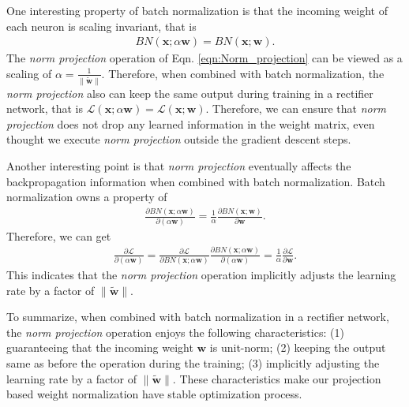 \documentclass[twocolumn]{article}
\begin{document}
One interesting property of batch normalization is that the incoming weight of each neuron is scaling invariant, that is
\begin{eqnarray}
BN(\mathbf{x}; \alpha \mathbf{w})=BN(\mathbf{x}; \mathbf{w}).
\end{eqnarray}
The \emph{norm projection} operation of Eqn. \ref{eqn:Norm_projection} can be viewed as a scaling of $\alpha=\frac{1}{\| \tilde{\mathbf{w}} \|}$. Therefore, when combined with batch normalization, the \emph{norm projection} also can keep the same output during training in a rectifier network, that is $\mathcal{L}(\mathbf{x}; \alpha \mathbf{w})=\mathcal{L}(\mathbf{x}; \mathbf{w})$. Therefore, we can ensure that \emph{norm projection} does not drop any learned information in the weight matrix, even thought we execute \emph{norm projection} outside the gradient descent steps.

Another interesting point is that \emph{norm projection} eventually affects the backpropagation information when combined with batch normalization. Batch normalization owns a property of
\begin{eqnarray}
\frac{\partial BN(\mathbf{x}; \alpha \mathbf{w}) }{\partial (\alpha \mathbf{w})}=\frac{1}{\alpha}   \frac{\partial BN(\mathbf{x}; \mathbf{w}) }{\partial  \mathbf{w}}.
\end{eqnarray}
Therefore, we can get
\begin{eqnarray}
\frac{\partial \mathcal{L} }{\partial (\alpha \mathbf{w})}
=\frac{\partial \mathcal{L} }{\partial BN(\mathbf{x}; \alpha \mathbf{w}) }   \frac{\partial BN(\mathbf{x}; \alpha \mathbf{w})  }{\partial (\alpha \mathbf{w})}
=\frac{1}{\alpha } \frac{\partial \mathcal{L} }{\partial  \mathbf{w}}.
\end{eqnarray}
This indicates that the \emph{norm projection} operation implicitly adjusts the learning rate by a factor of $\| \tilde{\mathbf{w}}\|$.

To summarize, when combined with batch normalization in a rectifier network, the \emph{norm projection} operation  enjoys the following characteristics: (1) guaranteeing that the incoming weight $\mathbf{w}$ is unit-norm; (2) keeping the output same as before the operation during the training; (3) implicitly adjusting the learning rate by a factor of $\| \tilde{\mathbf{w}}\|$. These characteristics make our projection based weight normalization have stable optimization process.
\end{document}
